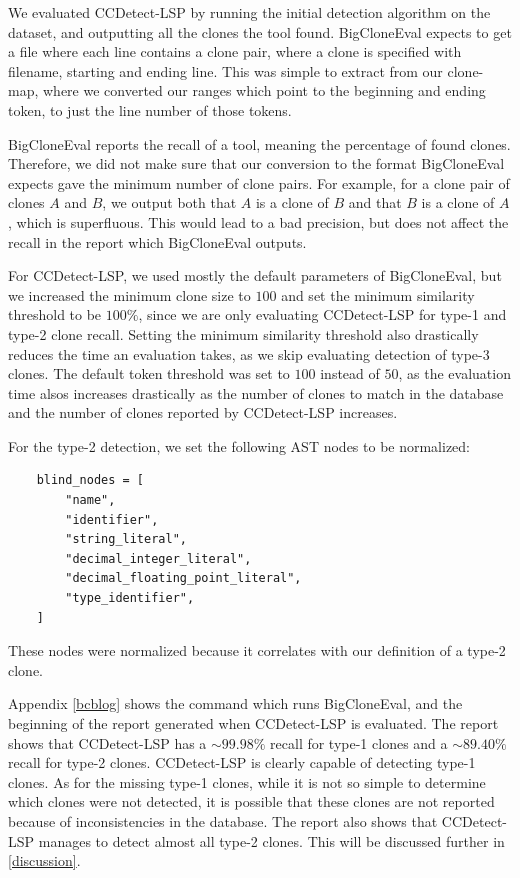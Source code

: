 We evaluated CCDetect-LSP by running the initial detection algorithm on the dataset, and
outputting all the clones the tool found. BigCloneEval expects to get a file where each
line contains a clone pair, where a clone is specified with filename, starting and
ending line. This was simple to extract from our clone-map, where we converted our ranges
which point to the beginning and ending token, to just the line number of those tokens.

BigCloneEval reports the recall of a tool, meaning the percentage of found clones.
Therefore, we did not make sure that our conversion to the format BigCloneEval expects
gave the minimum number of clone pairs. For example, for a clone pair of clones $A$ and
$B$, we output both that $A$ is a clone of $B$ and that $B$ is a clone of $A$, which is
superfluous. This would lead to a bad precision, but does not affect the recall in the
report which BigCloneEval outputs.

For CCDetect-LSP, we used mostly the default parameters of BigCloneEval, but we increased
the minimum clone size to $100$ and set the minimum similarity threshold to be $100\%$,
since we are only evaluating CCDetect-LSP for type-1 and type-2 clone recall. Setting the
minimum similarity threshold also drastically reduces the time an evaluation takes, as we
skip evaluating detection of type-3 clones. The default token threshold was set to $100$
instead of $50$, as the evaluation time alsos increases drastically as the number of
clones to match in the database and the number of clones reported by CCDetect-LSP
increases.

For the type-2 detection, we set the following AST nodes to be normalized:

\begin{lstlisting}
    blind_nodes = [
        "name",
        "identifier",
        "string_literal",
        "decimal_integer_literal",
        "decimal_floating_point_literal",
        "type_identifier",
    ]
\end{lstlisting}

These nodes were normalized because it correlates with our definition of a type-2 clone.

Appendix \ref{bcblog} shows the command which runs BigCloneEval, and the beginning of the
report generated when CCDetect-LSP is evaluated. The report shows that CCDetect-LSP has a
${\sim}99.98\%$ recall for type-1 clones and a ${\sim}89.40\%$ recall for type-2 clones.
CCDetect-LSP is clearly capable of detecting type-1 clones. As for the missing type-1
clones, while it is not so simple to determine which clones were not detected, it is
possible that these clones are not reported because of inconsistencies in the database.
The report also shows that CCDetect-LSP manages to detect almost all type-2 clones. This
will be discussed further in \cref{discussion}.

